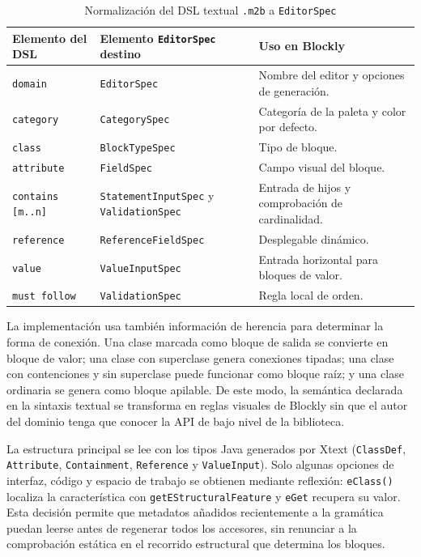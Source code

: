 \begin{table}[H]
  \centering
  \small
  \begin{tabular}{|L{0.30\textwidth}|L{0.30\textwidth}|L{0.26\textwidth}|}
    \hline
    Elemento del DSL & Elemento \texttt{EditorSpec} destino & Uso en Blockly \\
    \hline
    \texttt{domain} & \texttt{EditorSpec} & Nombre del editor y opciones de
    generación. \\
    \texttt{category} & \texttt{CategorySpec} & Categoría de la paleta y color por
    defecto. \\
    \texttt{class} & \texttt{BlockTypeSpec} & Tipo de bloque. \\
    \texttt{attribute} & \texttt{FieldSpec} & Campo visual del bloque. \\
    \texttt{contains [m..n]} & \texttt{StatementInputSpec} y
    \texttt{ValidationSpec} & Entrada de hijos y comprobación de cardinalidad. \\
    \texttt{reference} & \texttt{ReferenceFieldSpec} & Desplegable dinámico. \\
    \texttt{value} & \texttt{ValueInputSpec} & Entrada horizontal para bloques de
    valor. \\
    \texttt{must follow} & \texttt{ValidationSpec} & Regla local de orden. \\
    \hline
  \end{tabular}
  \caption{Normalización del DSL textual \texttt{.m2b} a \texttt{EditorSpec}}
  \label{tab:transformacion-dsl-editor-spec}
\end{table}

La implementación usa también información de herencia para determinar la forma
de conexión. Una clase marcada como bloque de salida se convierte en bloque de
valor; una clase con superclase genera conexiones tipadas; una clase con
contenciones y sin superclase puede funcionar como bloque raíz; y una clase
ordinaria se genera como bloque apilable. De este modo, la semántica declarada
en la sintaxis textual se transforma en reglas visuales de Blockly sin que el
autor del dominio tenga que conocer la API de bajo nivel de la biblioteca.

La estructura principal se lee con los tipos Java generados por Xtext
(\texttt{ClassDef}, \texttt{Attribute}, \texttt{Containment},
\texttt{Reference} y \texttt{ValueInput}). Solo algunas opciones de interfaz,
código y espacio de trabajo se obtienen mediante reflexión: \texttt{eClass()}
localiza la característica con \texttt{getEStructuralFeature} y \texttt{eGet}
recupera su valor. Esta decisión permite
que metadatos añadidos recientemente a la gramática puedan leerse antes de
regenerar todos los accesores, sin renunciar a la comprobación estática en el
recorrido estructural que determina los bloques.

